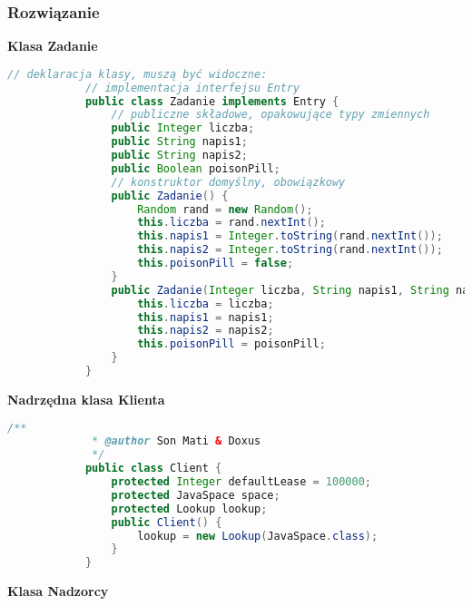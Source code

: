 		\subsubsection{Rozwiązanie}
			\textbf{Klasa Zadanie}
			\begin{lstlisting}[language=Java]
			// deklaracja klasy, muszą być widoczne:
			// implementacja interfejsu Entry
			public class Zadanie implements Entry {
				// publiczne składowe, opakowujące typy zmiennych
				public Integer liczba;
				public String napis1;
				public String napis2;
				public Boolean poisonPill;
				// konstruktor domyślny, obowiązkowy
				public Zadanie() {
					Random rand = new Random();
					this.liczba = rand.nextInt();
					this.napis1 = Integer.toString(rand.nextInt());
					this.napis2 = Integer.toString(rand.nextInt());
					this.poisonPill = false;
				}
				public Zadanie(Integer liczba, String napis1, String napis2, Boolean poisonPill) {
					this.liczba = liczba;
					this.napis1 = napis1;
					this.napis2 = napis2;
					this.poisonPill = poisonPill;
				}
			}
			\end{lstlisting}
			\textbf{Nadrzędna klasa Klienta}
			\begin{lstlisting}[language=Java]
			/**
			 * @author Son Mati & Doxus
			 */
			public class Client {
				protected Integer defaultLease = 100000;
				protected JavaSpace space;
				protected Lookup lookup;
				public Client() {
					lookup = new Lookup(JavaSpace.class);
				}
			}
			\end{lstlisting}
			\newpage
			\textbf{Klasa Nadzorcy}

